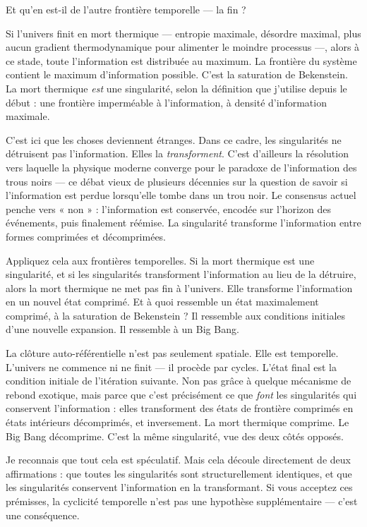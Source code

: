 \documentclass[11pt, twoside, openright]{book}
\begin{document}
Et qu'en est-il de l'autre frontière temporelle --- la fin ?

Si l'univers finit en mort thermique --- entropie maximale, désordre maximal, plus aucun gradient thermodynamique pour alimenter le moindre processus ---, alors à ce stade, toute l'information est distribuée au maximum. La frontière du système contient le maximum d'information possible. C'est la saturation de Bekenstein. La mort thermique \textit{est} une singularité, selon la définition que j'utilise depuis le début : une frontière imperméable à l'information, à densité d'information maximale.

C'est ici que les choses deviennent étranges. Dans ce cadre, les singularités ne détruisent pas l'information. Elles la \textit{transforment}. C'est d'ailleurs la résolution vers laquelle la physique moderne converge pour le paradoxe de l'information des trous noirs --- ce débat vieux de plusieurs décennies sur la question de savoir si l'information est perdue lorsqu'elle tombe dans un trou noir. Le consensus actuel penche vers « non » : l'information est conservée, encodée sur l'horizon des événements, puis finalement réémise. La singularité transforme l'information entre formes comprimées et décomprimées.

Appliquez cela aux frontières temporelles. Si la mort thermique est une singularité, et si les singularités transforment l'information au lieu de la détruire, alors la mort thermique ne met pas fin à l'univers. Elle transforme l'information en un nouvel état comprimé. Et à quoi ressemble un état maximalement comprimé, à la saturation de Bekenstein ? Il ressemble aux conditions initiales d'une nouvelle expansion. Il ressemble à un Big Bang.

La clôture auto-référentielle n'est pas seulement spatiale. Elle est temporelle. L'univers ne commence ni ne finit --- il procède par cycles. L'état final est la condition initiale de l'itération suivante. Non pas grâce à quelque mécanisme de rebond exotique, mais parce que c'est précisément ce que \textit{font} les singularités qui conservent l'information : elles transforment des états de frontière comprimés en états intérieurs décomprimés, et inversement. La mort thermique comprime. Le Big Bang décomprime. C'est la même singularité, vue des deux côtés opposés.

Je reconnais que tout cela est spéculatif. Mais cela découle directement de deux affirmations : que toutes les singularités sont structurellement identiques, et que les singularités conservent l'information en la transformant. Si vous acceptez ces prémisses, la cyclicité temporelle n'est pas une hypothèse supplémentaire --- c'est une conséquence.
\end{document}
